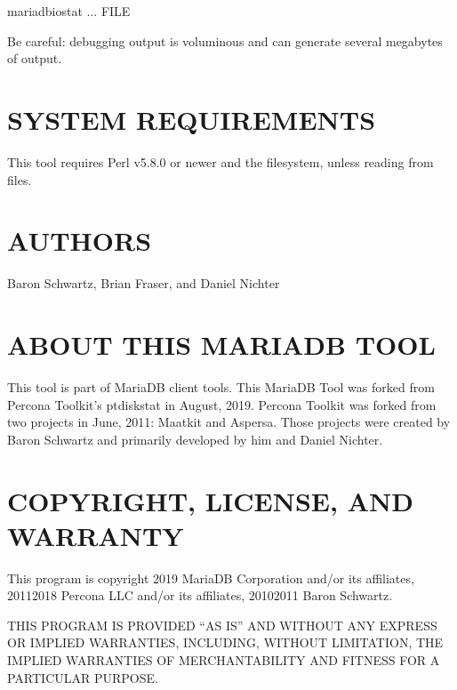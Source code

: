 \documentclass[letterpaper,10pt,english]{sphinxmanual}
\begin{document}
\begin{sphinxVerbatim}[commandchars=\\\{\}]
 mariadb\PYGZhy{}iostat ... \PYGZgt{} FILE \PYGZgt{}
\end{sphinxVerbatim}

\sphinxAtStartPar
Be careful: debugging output is voluminous and can generate several megabytes
of output.


\section{SYSTEM REQUIREMENTS}
\label{\detokenize{mariadb-iostat:system-requirements}}
\sphinxAtStartPar
This tool requires Perl v5.8.0 or newer and the  filesystem, unless
reading from files.


\section{AUTHORS}
\label{\detokenize{mariadb-iostat:authors}}
\sphinxAtStartPar
Baron Schwartz, Brian Fraser, and Daniel Nichter


\section{ABOUT THIS MARIADB TOOL}
\label{\detokenize{mariadb-iostat:about-this-mariadb-tool}}
\sphinxAtStartPar
This tool is part of MariaDB client tools. This MariaDB Tool was forked from
Percona Toolkit’s pt\sphinxhyphen{}diskstat in August, 2019. Percona Toolkit was forked from two
projects in June, 2011: Maatkit and Aspersa.  Those projects were created by
Baron Schwartz and primarily developed by him and Daniel Nichter.


\section{COPYRIGHT, LICENSE, AND WARRANTY}
\label{\detokenize{mariadb-iostat:copyright-license-and-warranty}}
\sphinxAtStartPar
This program is copyright 2019 MariaDB Corporation and/or its affiliates,
2011\sphinxhyphen{}2018 Percona LLC and/or its affiliates, 2010\sphinxhyphen{}2011 Baron Schwartz.

\sphinxAtStartPar
THIS PROGRAM IS PROVIDED “AS IS” AND WITHOUT ANY EXPRESS OR IMPLIED
WARRANTIES, INCLUDING, WITHOUT LIMITATION, THE IMPLIED WARRANTIES OF
MERCHANTABILITY AND FITNESS FOR A PARTICULAR PURPOSE.
\end{document}
